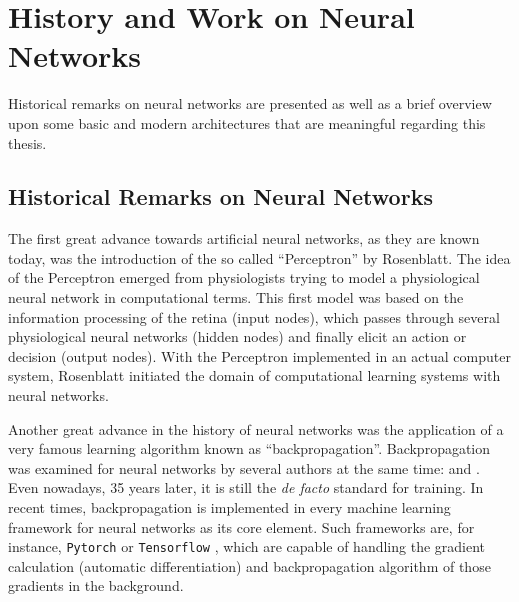 
\section{History and Work on Neural Networks}\label{sec:prev_nn}
Historical remarks on neural networks are presented as well as a brief overview upon some basic and modern architectures that are meaningful regarding this thesis.



\subsection{Historical Remarks on Neural Networks}\label{sec:prev_nn_history}
The first great advance towards artificial neural networks, as they are known today, was the introduction of the so called \enquote{Perceptron} \cite{Rosenblatt1958} by Rosenblatt. 
The idea of the Perceptron emerged from physiologists trying to model a physiological neural network in computational terms. 
This first model was based on the information processing of the retina (input nodes), which passes through several physiological neural networks (hidden nodes) and finally elicit an action or decision (output nodes).
With the Perceptron implemented in an actual computer system, Rosenblatt initiated the domain of computational learning systems with neural networks.

Another great advance in the history of neural networks was the application of a very famous learning algorithm known as \enquote{backpropagation}.
Backpropagation was examined for neural networks by several authors at the same time: \cite{LeCun1986} and \cite{Rumelhart1986}.
Even nowadays, 35 years later, it is still the \emph{de facto} standard for training.
In recent times, backpropagation is implemented in every machine learning framework for neural networks as its core element.
Such frameworks are, for instance, \texttt{Pytorch} \cite{Paszke2019Pytorch} or \texttt{Tensorflow} \cite{Tensorflow}, which are capable of handling the gradient calculation (automatic differentiation) and backpropagation algorithm of those gradients in the background.

